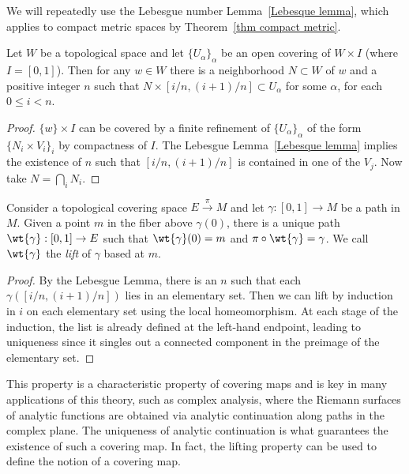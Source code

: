 We will repeatedly use the Lebesgue number Lemma~\ref{Lebesque lemma}, which applies to compact metric spaces by Theorem~\ref{thm compact metric}.
\begin{lem}\label{Lemma 3.2 Bredon}
    Let $W$ be a topological space and let $\{U_\alpha\}_\alpha$ be an open covering of $W\times I$ (where $I=[0,1]$).  Then for any $w\in W$ there is a neighborhood $N\subset W$ of $w$ and a positive integer $n$ such that $N\times [i/n, (i+1)/n]\subset U_\alpha$ for some $\alpha$, for each $0\leq i <n$.
\end{lem}
\begin{proof}
    $\{w\}\times I$ can be covered by a finite refinement of $\{U_\alpha\}_\alpha$ of the form $\{N_i\times V_i\}_i$ by compactness of $I$. The Lebesgue Lemma~\ref{Lebesque lemma} implies the existence of $n$ such that $[i/n,(i+1)/n]$ is contained in one of the $V_j$. Now take $N=\bigcap_i N_i$.
\end{proof}

\begin{thm}\label{Path lifting property}
    Consider a topological covering space $E\overset{\pi}{\to}M$ and let $\gamma:[0,1]\to M$ be a path in $M$. Given a point $m$ in the fiber above $\gamma(0)$, there is a unique path $\wt{\gamma}:[0,1]\to E$ such that $\wt{\gamma}(0)=m$ and $\pi\circ\wt{\gamma}=\gamma$. We call $\wt{\gamma}$ the \emph{lift} of $\gamma$ based at $m$.
\end{thm}
\begin{proof}
    By the Lebesgue Lemma, there is an $n$ such that each $\gamma([i/n,(i+1)/n])$ lies in an elementary set. Then we can lift by induction in $i$ on each elementary set using the local homeomorphism. At each stage of the induction, the list is already defined at the left-hand endpoint, leading to uniqueness since it singles out a connected component in the preimage of the elementary set.
\end{proof}
This property is a characteristic property of covering maps and is key in many applications of this theory, such as complex analysis, where the Riemann surfaces of analytic functions are obtained via analytic continuation along paths in the complex plane. The uniqueness of analytic continuation is what guarantees the existence of such a covering map. In fact, the lifting property can be used to define the notion of a covering map.

